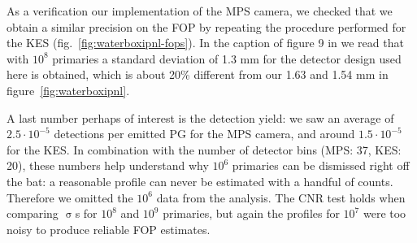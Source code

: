 \documentclass[a4paper,english]{article}
\begin{document}
As a verification our implementation of the MPS camera, we checked that we obtain a similar precision on the FOP by repeating the procedure performed for the KES (fig.~\ref{fig:waterboxipnl-fops}). In the caption of figure 9 in \cite{Pinto2014a} we read that with $10^8$ primaries a standard deviation of 1.3 mm for the detector design used here is obtained, which is about 20\% different from our 1.63 and 1.54 mm in figure~\ref{fig:waterboxipnl}.


A last number perhaps of interest is the detection yield: we saw an average of $2.5\cdot10^{-5}$ detections per emitted PG for the MPS camera, and around $1.5\cdot10^{-5}$ for the KES. In combination with the number of detector bins (MPS: 37, KES: 20), these numbers help understand why $10^6$ primaries can be dismissed right off the bat: a reasonable profile can never be estimated with a handful of counts. Therefore we omitted the $10^6$ data from the analysis. The CNR test holds when comparing $\upsigma$s for $10^8$ and $10^9$ primaries, but again the profiles for $10^7$ were too noisy to produce reliable FOP estimates.


\end{document}
